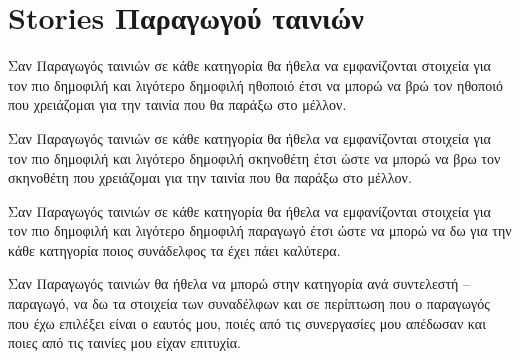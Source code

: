 \section{Stories Παραγωγού ταινιών}

\begin{tcolorbox}[colback=fg!10!white,colframe=pbg!100!white,
	title=1η ιστορία]
Σαν Παραγωγός ταινιών σε κάθε κατηγορία θα ήθελα να εμφανίζονται στοιχεία για τον πιο δημοφιλή και λιγότερο δημοφιλή ηθοποιό έτσι να μπορώ να βρώ τον ηθοποιό που χρειάζομαι για την ταινία που θα παράξω στο μέλλον. 
\end{tcolorbox}

\begin{tcolorbox}[colback=fg!10!white,colframe=pbg!100!white,
	title=2η ιστορία]
Σαν Παραγωγός ταινιών σε κάθε κατηγορία θα ήθελα να εμφανίζονται στοιχεία για τον πιο δημοφιλή και λιγότερο δημοφιλή σκηνοθέτη έτσι ώστε να μπορώ να βρω τον σκηνοθέτη που χρειάζομαι για την ταινία που θα παράξω στο μέλλον.
\end{tcolorbox}

\begin{tcolorbox}[colback=fg!10!white,colframe=pbg!100!white,
	title=3η ιστορία]
Σαν Παραγωγός ταινιών σε κάθε κατηγορία θα ήθελα να εμφανίζονται στοιχεία για τον πιο δημοφιλή και λιγότερο δημοφιλή παραγωγό έτσι ώστε να μπορώ να δω για την κάθε κατηγορία ποιος συνάδελφος τα έχει πάει καλύτερα.
\end{tcolorbox}

\begin{tcolorbox}[colback=fg!10!white,colframe=pbg!100!white,
	title=4η ιστορία]
Σαν Παραγωγός ταινιών θα ήθελα να μπορώ στην κατηγορία ανά συντελεστή -- παραγωγό, να δω τα στοιχεία των συναδέλφων και σε περίπτωση που ο παραγωγός που έχω επιλέξει είναι ο εαυτός μου, ποιές από τις συνεργασίες μου απέδωσαν και ποιες από τις ταινίες μου είχαν επιτυχία.
\end{tcolorbox}